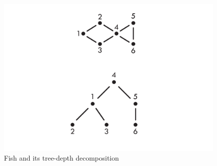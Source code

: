 \begin{figure}[hbt!]
	\centering
	\includegraphics[scale=0.5,valign=t]{rybka.pdf}
	\caption{Fish and its tree-depth decomposition}
\end{figure}


